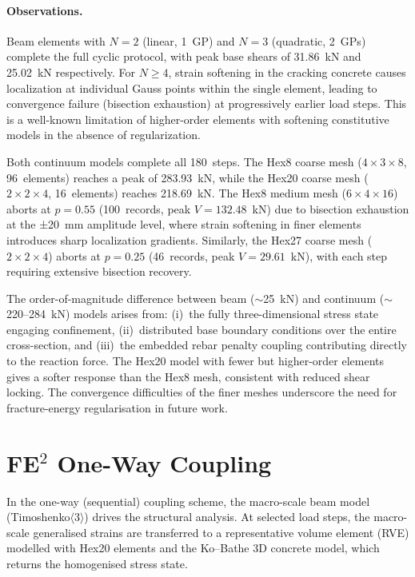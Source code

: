 \paragraph{Observations.}
Beam elements with $N=2$ (linear, 1~GP) and $N=3$ (quadratic, 2~GPs)
complete the full cyclic protocol, with peak base shears of 31.86~kN and
25.02~kN respectively.  For $N \ge 4$, strain softening in the cracking
concrete causes localization at individual Gauss points within the single
element, leading to convergence failure (bisection exhaustion) at
progressively earlier load steps.  This is a well-known limitation of
higher-order elements with softening constitutive models in the absence
of regularization.

Both continuum models complete all 180~steps.  The Hex8 coarse mesh
($4\!\times\!3\!\times\!8$, 96~elements) reaches a peak of 283.93~kN,
while the Hex20 coarse mesh ($2\!\times\!2\!\times\!4$, 16~elements)
reaches 218.69~kN.  The Hex8 medium mesh ($6\!\times\!4\!\times\!16$)
aborts at $p = 0.55$ (100~records, peak $V = 132.48$~kN) due to
bisection exhaustion at the ±20~mm amplitude level, where
strain softening in finer elements introduces sharp localization
gradients.  Similarly, the Hex27 coarse mesh ($2\!\times\!2\!\times\!4$)
aborts at $p = 0.25$ (46~records, peak $V = 29.61$~kN), with each
step requiring extensive bisection recovery.

The order-of-magnitude difference between beam
($\sim$25~kN) and continuum ($\sim$220--284~kN) models arises from:
(i)~the fully three-dimensional stress state engaging confinement,
(ii)~distributed base boundary conditions over the entire cross-section,
and (iii)~the embedded rebar penalty coupling contributing directly
to the reaction force.  The Hex20 model with fewer but higher-order
elements gives a softer response than the Hex8 mesh, consistent with
reduced shear locking.  The convergence difficulties of the finer meshes
underscore the need for fracture-energy regularisation in future work.


\section{FE$^2$ One-Way Coupling}
\label{sec:v2-fe2-oneway}

In the one-way (sequential) coupling scheme, the macro-scale beam
model (Timoshenko$\langle3\rangle$) drives the structural analysis.
At selected load steps, the macro-scale generalised strains are
transferred to a representative volume element (RVE) modelled with
Hex20 elements and the Ko--Bathe 3D concrete model, which returns
the homogenised stress state.

